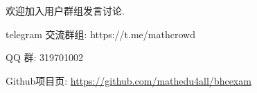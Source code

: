 \documentclass[answers]{BHCexam}
\begin{document}
\begin{groups}
\begin{questions}[st]
\begin{solution}{4cm}
	\methodonly 欢迎加入用户群组发言讨论. 
	
telegram 交流群组: https://t.me/mathcrowd

QQ 群: 319701002

Github项目页: \url{https://github.com/mathedu4all/bhcexam}

	
\end{solution}
\end{questions}

\end{groups}
\end{document}

